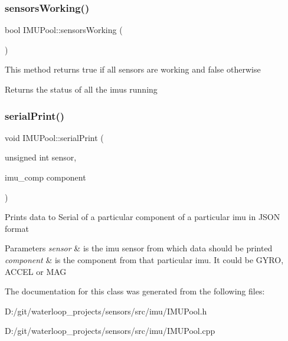 \subsubsection{\texorpdfstring{sensors\+Working()}{sensorsWorking()}}
{\footnotesize\ttfamily bool I\+M\+U\+Pool\+::sensors\+Working (\begin{DoxyParamCaption}{ }\end{DoxyParamCaption})}

This method returns true if all sensors are working and false otherwise \begin{DoxyReturn}{Returns}
the status of all the imus running 
\end{DoxyReturn}
\mbox{\label{class_i_m_u_pool_ae656ae411b188d1484c524dd42c6cbfa}} 
\subsubsection{\texorpdfstring{serial\+Print()}{serialPrint()}}
{\footnotesize\ttfamily void I\+M\+U\+Pool\+::serial\+Print (\begin{DoxyParamCaption}\item[{unsigned int}]{sensor,  }\item[{imu\+\_\+comp}]{component }\end{DoxyParamCaption})}

Prints data to Serial of a particular component of a particular imu in J\+S\+ON format 
\begin{DoxyParams}{Parameters}
{\em sensor} & is the imu sensor from which data should be printed \\
\hline
{\em component} & is the component from that particular imu. It could be G\+Y\+RO, A\+C\+C\+EL or M\+AG \\
\hline
\end{DoxyParams}


The documentation for this class was generated from the following files\+:\begin{DoxyCompactItemize}
\item 
D\+:/git/waterloop\+\_\+projects/sensors/src/imu/I\+M\+U\+Pool.\+h\item 
D\+:/git/waterloop\+\_\+projects/sensors/src/imu/I\+M\+U\+Pool.\+cpp\end{DoxyCompactItemize}
